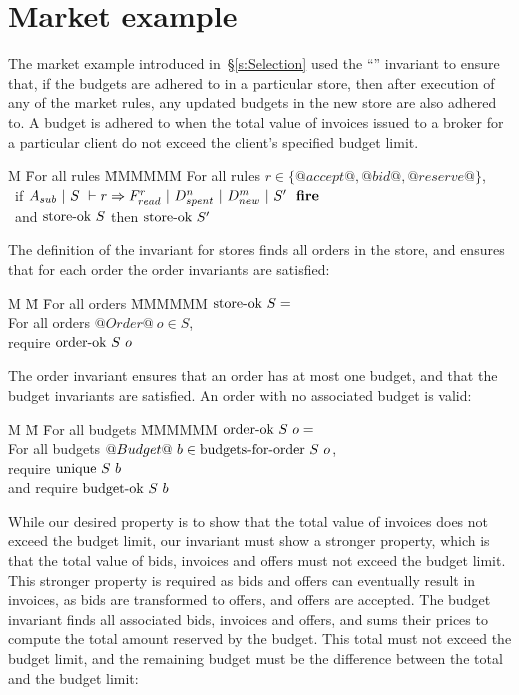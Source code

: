 \appendix
\section{Market example}

The market example introduced in~\S\ref{s:Selection} used the ``'' invariant to ensure that, if the budgets are adhered to in a particular store, then after execution of any of the market rules, any updated budgets in the new store are also adhered to.
A budget is adhered to when the total value of invoices issued to a broker for a particular client do not exceed the client's specified budget limit.

\begin{tabbing}
M \= For all rules \= MMMMMM \kill
\> For all rules \> $r \in \{@accept@, @bid@, @reserve@\}$, \\
\> ~if   \> $A_{sub}~|~S~\vdash r \Rightarrow F_{read}^r~|~D_{spent}^n~|~D_{new}^m~|~S'~~\textbf{fire}$ \\
\> ~and \> $\textrm{store-ok}~{S}$ \hspace{1ex} then \hspace{1ex} $\textrm{store-ok}~{S'}$
\end{tabbing}

The definition of the invariant for stores finds all orders in the store, and ensures that for each order the order invariants are satisfied:

\begin{tabbing}
M \= M \= For all orders \= MMMMMM \kill
\> $\textrm{store-ok}~{S} = $ \\
\> \> For all orders \> $@Order@~o \in S$, \\
\> \> require \> $\textrm{order-ok}~{S}~o$
\end{tabbing}

The order invariant ensures that an order has at most one budget, and that the budget invariants are satisfied. An order with no associated budget is valid:

\begin{tabbing}
M \= M \= For all budgets \= MMMMMM \kill
\> $\textrm{order-ok}~{S}~o = $ \\
\> \> For all budgets \> $@Budget@~b \in \textrm{budgets-for-order}~S~o$, \\
\> \> require \> $\textrm{unique}~S~b$ \\
\> \> and require \> $\textrm{budget-ok}~{S}~b$
\end{tabbing}

While our desired property is to show that the total value of invoices does not exceed the budget limit, our invariant must show a stronger property, which is that the total value of bids, invoices and offers must not exceed the budget limit.
This stronger property is required as bids and offers can eventually result in invoices, as bids are transformed to offers, and offers are accepted. 
The budget invariant finds all associated bids, invoices and offers, and sums their prices to compute the total amount reserved by the budget. This total must not exceed the budget limit, and the remaining budget must be the difference between the total and the budget limit:


